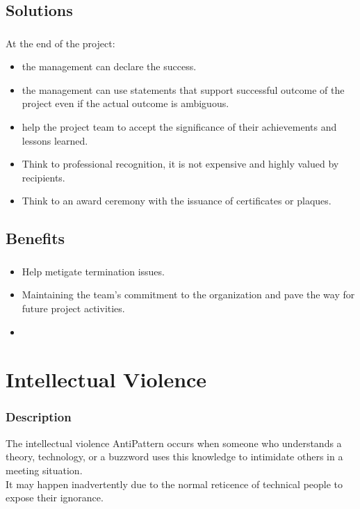 \documentclass{beamer}
\begin{document}
\subsection{Solutions}
\begin{frame}
\frametitle{}
At the end of the project:
\begin{itemize}
\item the management can declare the success.
\item the management can use statements that support successful outcome of the project even if the actual outcome is ambiguous.
\item help the project team to accept the significance of their achievements and lessons learned.
\item Think to professional recognition, it is not expensive and highly valued by recipients.
\item Think to an award ceremony with the issuance of certificates or plaques.
\end{itemize}
 
\end{frame}

\subsection{Benefits}
\begin{frame}
\frametitle{}
\begin{itemize}
\item Help metigate termination issues.
\item Maintaining the team's commitment to the organization and pave the way for future project activities.
\item 
\end{itemize}
\end{frame}

\section{Intellectual Violence}
\begin{frame}
\frametitle{Description}
The intellectual violence AntiPattern occurs when someone who understands a theory, technology, or a buzzword uses this knowledge to intimidate others in a meeting situation.\\
It may happen inadvertently due to the normal reticence of technical people to expose their ignorance.
\end{frame}
\end{document}
